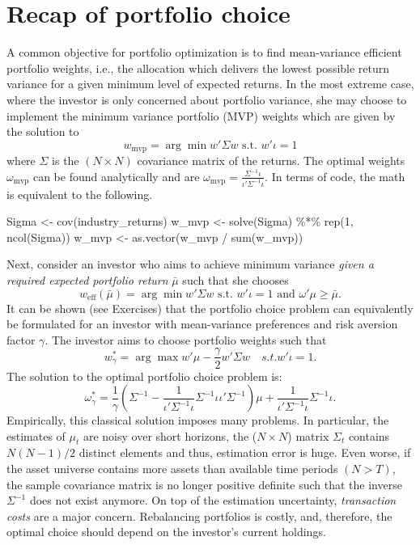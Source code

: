 \documentclass[
]{krantz}
\newenvironment{Shaded}{\begin{snugshade}}{\end{snugshade}}
\newcommand{\DecValTok}[1]{\textcolor[rgb]{0.06,0.06,0.06}{#1}}
\newcommand{\FunctionTok}[1]{\textcolor[rgb]{0,0,0}{#1}}
\newcommand{\NormalTok}[1]{#1}
\newcommand{\OtherTok}[1]{\textcolor[rgb]{0.37,0.37,0.37}{#1}}
\newcommand{\SpecialCharTok}[1]{\textcolor[rgb]{0,0,0}{#1}}
\begin{document}
\hypertarget{recap-of-portfolio-choice}{%
\section{Recap of portfolio choice}\label{recap-of-portfolio-choice}}

A common objective for portfolio optimization is to find mean-variance efficient portfolio weights, i.e., the allocation which delivers the lowest possible return variance for a given minimum level of expected returns. In the most extreme case, where the investor is only concerned about portfolio variance, she may choose to implement the minimum variance portfolio (MVP) weights which are given by the solution to
\[w_\text{mvp} = \arg\min w'\Sigma w \text{ s.t. } w'\iota = 1\]
where \(\Sigma\) is the \((N \times N)\) covariance matrix of the returns. The optimal weights \(\omega_\text{mvp}\) can be found analytically and are \(\omega_\text{mvp} = \frac{\Sigma^{-1}\iota}{\iota'\Sigma^{-1}\iota}\). In terms of code, the math is equivalent to the following.

\begin{Shaded}
\begin{Highlighting}[]
\NormalTok{Sigma }\OtherTok{\textless{}{-}} \FunctionTok{cov}\NormalTok{(industry\_returns)}
\NormalTok{w\_mvp }\OtherTok{\textless{}{-}} \FunctionTok{solve}\NormalTok{(Sigma) }\SpecialCharTok{\%*\%} \FunctionTok{rep}\NormalTok{(}\DecValTok{1}\NormalTok{, }\FunctionTok{ncol}\NormalTok{(Sigma))}
\NormalTok{w\_mvp }\OtherTok{\textless{}{-}} \FunctionTok{as.vector}\NormalTok{(w\_mvp }\SpecialCharTok{/} \FunctionTok{sum}\NormalTok{(w\_mvp))}
\end{Highlighting}
\end{Shaded}

Next, consider an investor who aims to achieve minimum variance \emph{given a required expected portfolio return} \(\bar{\mu}\) such that she chooses
\[w_\text{eff}({\bar{\mu}}) =\arg\min w'\Sigma w \text{ s.t. } w'\iota = 1 \text{ and } \omega'\mu \geq \bar{\mu}.\]
It can be shown (see Exercises) that the portfolio choice problem can equivalently be formulated for an investor with mean-variance preferences and risk aversion factor \(\gamma\). The investor aims to choose portfolio weights such that
\[ w^*_\gamma = \arg\max w' \mu - \frac{\gamma}{2}w'\Sigma w\quad s.t. w'\iota = 1.\]
The solution to the optimal portfolio choice problem is:
\[\omega^*_{\gamma}  = \frac{1}{\gamma}\left(\Sigma^{-1} - \frac{1}{\iota' \Sigma^{-1}\iota }\Sigma^{-1}\iota\iota' \Sigma^{-1} \right) \mu  + \frac{1}{\iota' \Sigma^{-1} \iota }\Sigma^{-1} \iota.\]
Empirically, this classical solution imposes many problems. In particular, the estimates of \(\mu_t\) are noisy over short horizons, the (\(N \times N\)) matrix \(\Sigma_t\) contains \(N(N-1)/2\) distinct elements and thus, estimation error is huge. Even worse, if the asset universe contains more assets than available time periods \((N > T)\), the sample covariance matrix is no longer positive definite such that the inverse \(\Sigma^{-1}\) does not exist anymore. On top of the estimation uncertainty, \emph{transaction costs} are a major concern. Rebalancing portfolios is costly, and, therefore, the optimal choice should depend on the investor's current holdings.
\end{document}

